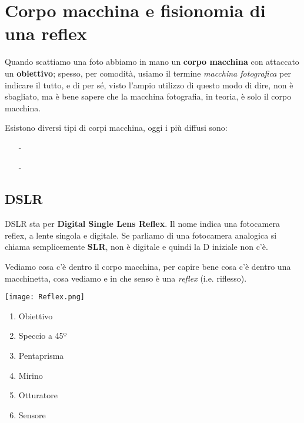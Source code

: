 \section{Corpo macchina e fisionomia di una reflex} \label{sec:fisionomia}

Quando scattiamo una foto abbiamo in mano un \textbf{corpo macchina} con attaccato un \textbf{obiettivo}; spesso, per comodità, usiamo il termine \textit{macchina fotografica} per indicare il tutto, e di per sé, visto l'ampio utilizzo di questo modo di dire, non è sbagliato, ma è bene sapere che la macchina fotografia, in teoria, è solo il corpo macchina.

Esistono diversi tipi di corpi macchina, oggi i più diffusi sono:
\begin{itemize}
    \item[-] 
    \item[-] 
\end{itemize}


\subsection{DSLR} \label{subsec:dslr}
DSLR sta per \textbf{Digital Single Lens Reflex}.\newline
Il nome indica una fotocamera reflex, a lente singola e digitale. Se parliamo di una fotocamera analogica si chiama semplicemente \textbf{SLR}, non è digitale e quindi la D iniziale non c'è.

Vediamo cosa c'è dentro il corpo macchina, per capire bene cosa c'è dentro una macchinetta, cosa vediamo e in che senso è una \textit{reflex} (i.e. riflesso).

\setlength{\columnsep}{2.8cm}
\begin{multicols}{2}
    \texttt{[image: Reflex.png]}

    \columnbreak

    \begin{enumerate}
        \setcounter{enumi}{0}
        \item Obiettivo
        \item Speccio a 45º
        \item Pentaprisma
        \item Mirino
        \item Otturatore
        \item Sensore
    \end{enumerate}
\end{multicols}


